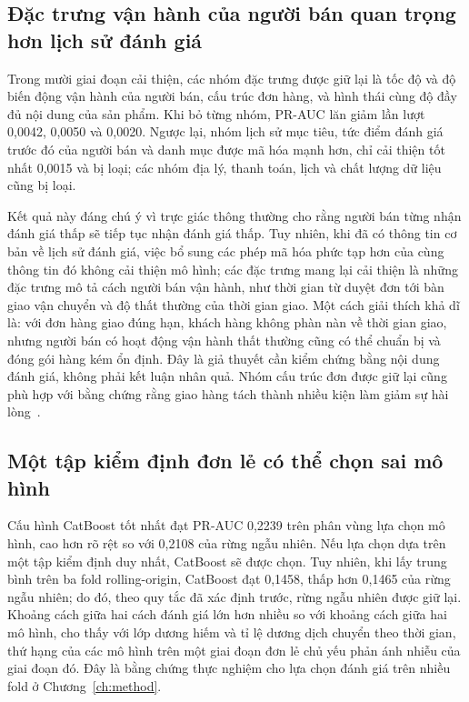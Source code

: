 \subsection{Đặc trưng vận hành của người bán quan trọng hơn lịch sử đánh giá}

Trong mười giai đoạn cải thiện, các nhóm đặc trưng được giữ lại là tốc độ và độ biến động vận hành của người bán, cấu trúc đơn hàng, và hình thái cùng độ đầy đủ nội dung của sản phẩm. Khi bỏ từng nhóm, PR-AUC lăn giảm lần lượt 0,0042, 0,0050 và 0,0020. Ngược lại, nhóm lịch sử mục tiêu, tức điểm đánh giá trước đó của người bán và danh mục được mã hóa mạnh hơn, chỉ cải thiện tốt nhất 0,0015 và bị loại; các nhóm địa lý, thanh toán, lịch và chất lượng dữ liệu cũng bị loại.

Kết quả này đáng chú ý vì trực giác thông thường cho rằng người bán từng nhận đánh giá thấp sẽ tiếp tục nhận đánh giá thấp. Tuy nhiên, khi đã có thông tin cơ bản về lịch sử đánh giá, việc bổ sung các phép mã hóa phức tạp hơn của cùng thông tin đó không cải thiện mô hình; các đặc trưng mang lại cải thiện là những đặc trưng mô tả cách người bán vận hành, như thời gian từ duyệt đơn tới bàn giao vận chuyển và độ thất thường của thời gian giao. Một cách giải thích khả dĩ là: với đơn hàng giao đúng hạn, khách hàng không phàn nàn về thời gian giao, nhưng người bán có hoạt động vận hành thất thường cũng có thể chuẩn bị và đóng gói hàng kém ổn định. Đây là giả thuyết cần kiểm chứng bằng nội dung đánh giá, không phải kết luận nhân quả. Nhóm cấu trúc đơn được giữ lại cũng phù hợp với bằng chứng rằng giao hàng tách thành nhiều kiện làm giảm sự hài lòng~\cite{brylla2022}.

\subsection{Một tập kiểm định đơn lẻ có thể chọn sai mô hình}

Cấu hình CatBoost tốt nhất đạt PR-AUC 0,2239 trên phân vùng lựa chọn mô hình, cao hơn rõ rệt so với 0,2108 của rừng ngẫu nhiên. Nếu lựa chọn dựa trên một tập kiểm định duy nhất, CatBoost sẽ được chọn. Tuy nhiên, khi lấy trung bình trên ba fold rolling-origin, CatBoost đạt 0,1458, thấp hơn 0,1465 của rừng ngẫu nhiên; do đó, theo quy tắc đã xác định trước, rừng ngẫu nhiên được giữ lại. Khoảng cách giữa hai cách đánh giá lớn hơn nhiều so với khoảng cách giữa hai mô hình, cho thấy với lớp dương hiếm và tỉ lệ dương dịch chuyển theo thời gian, thứ hạng của các mô hình trên một giai đoạn đơn lẻ chủ yếu phản ánh nhiễu của giai đoạn đó. Đây là bằng chứng thực nghiệm cho lựa chọn đánh giá trên nhiều fold ở Chương~\ref{ch:method}.

